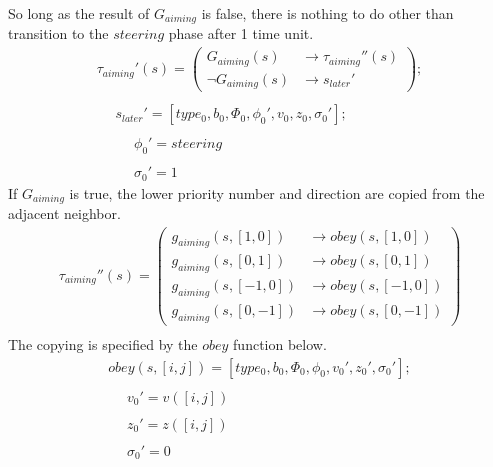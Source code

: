 \documentclass{acm_proc_article-sp}
\begin{document}
So long as the result of $G_{aiming}$ is false, there is
nothing to do other than transition to the $steering$ phase
after 1 time unit.
\begin{displaymath} \begin{array}{l}
\tau_{aiming}'(s) = \left( \begin{array}{ll} G_{aiming}(s)      & \rightarrow \tau_{aiming}''(s) \\
                                             \neg G_{aiming}(s) & \rightarrow s_{later}' \end{array} \right); \\
\\
\hspace{16pt} s_{later}' = [type_0, b_0, \Phi_0, \phi_0', v_0, z_0, \sigma_0']; \\
\\
\hspace{16pt} \hspace{16pt} \phi_0' = steering \\
\\
\hspace{16pt} \hspace{16pt} \sigma_0' = 1 
\end{array} \end{displaymath}
If $G_{aiming}$ is true, the lower priority number and 
direction are copied from the adjacent neighbor.
\begin{displaymath} \begin{array}{l}
\tau_{aiming}''(s) = \left( \begin{array}{ll} g_{aiming}(s, [1, 0]) & \rightarrow obey(s, [1, 0]) \\
                                              g_{aiming}(s, [0, 1]) & \rightarrow obey(s, [0, 1]) \\
                                              g_{aiming}(s, [-1, 0]) & \rightarrow obey(s, [-1, 0]) \\
                                              g_{aiming}(s, [0, -1]) & \rightarrow obey(s, [0, -1]) \end{array} \right) \\
\end{array} \end{displaymath}
The copying is specified by the $obey$ function below.
\begin{displaymath} \begin{array}{l}
obey(s, [i, j]) = [type_0, b_0, \Phi_0, \phi_0, v_0', z_0', \sigma_0']; \\
\\
\hspace{16pt} v_0' = v([i, j]) \\
\\
\hspace{16pt} z_0' = z([i, j]) \\
\\
\hspace{16pt} \sigma_0' = 0
\end{array} \end{displaymath}
\end{document}
